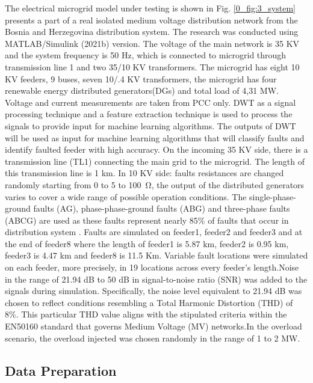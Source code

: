 \documentclass[8pt,a4paper,oneside]{elsarticle}
\begin{document}
The electrical microgrid model under testing is shown in Fig. \ref{0_fig:3_system} presents a part of a real isolated medium voltage distribution network from the Bosnia and Herzegovina distribution system. The research was conducted using MATLAB/Simulink (2021b) version. The voltage of the main network is 35 KV and the system frequency is 50 Hz, which is connected to microgrid through transmission line 1 and two 35/10 KV transformers. The microgrid has eight 10 KV feeders, 9 buses, seven 10/.4 KV transformers, the microgrid has four renewable energy distributed generators(DGs) and total load of 4,31 MW. 
Voltage and current measurements are taken from PCC only. DWT as a signal processing technique and a feature extraction technique is used to process the signals to provide input for machine learning algorithms. The outputs of DWT will be used as input for machine learning algorithms that will classify faults and identify faulted feeder with high accuracy. On the incoming 35 KV side, there is a transmission line (TL1) connecting the main grid to the microgrid. The length of this transmission line is 1 km.
In 10 KV side: faults resistances are changed randomly starting from 0 to 5 to \SI{100}{\ohm}, the output of the distributed generators varies to cover a wide range of possible operation conditions. The single-phase-ground faults (AG), phase-phase-ground faults (ABG) and three-phase faults (ABCG) are used as these faults represent nearly 85\%  of faults that occur in distribution system \cite{10.36478/jeasci.2019.10058.10066_18}. Faults are simulated on feeder1, feeder2 and feeder3 and at the end of feeder8 where the length of feeder1 is 5.87 km, feeder2 is 0.95 km, feeder3 is 4.47 km and feeder8 is 11.5 Km. Variable fault locations were simulated on each feeder, more precisely, in 19 locations across every feeder’s length.Noise in the range of 21.94 dB to 50 dB in signal-to-noise ratio (SNR) was added to the signals during simulation. Specifically, the noise level equivalent to 21.94 dB was chosen to reflect conditions resembling a Total Harmonic Distortion (THD) of 8\%. This particular THD value aligns with the stipulated criteria within the EN50160 standard that governs Medium Voltage (MV) networks\cite{hubana9066305_10}.In the overload scenario, the overload injected was chosen randomly in the range of 1 to 2 MW.
 
\subsection{Data Preparation}
\end{document}
